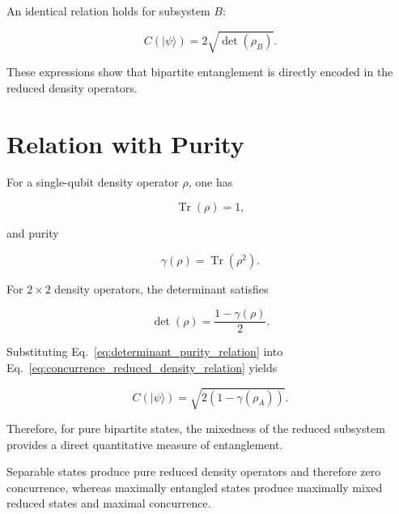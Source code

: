 \medskip

An identical relation holds for subsystem \( B \):

\begin{equation}
C(|\psi\rangle)
=
2\sqrt{\det(\rho_B)}.
\end{equation}

These expressions show that bipartite entanglement is directly encoded in the reduced density operators.


\section*{Relation with Purity}

For a single-qubit density operator \( \rho \), one has

\begin{equation}
\operatorname{Tr}(\rho)=1,
\label{eq:single_qubit_trace_condition}
\end{equation}

and purity

\begin{equation}
\gamma(\rho)
=
\operatorname{Tr}(\rho^2).
\label{eq:single_qubit_purity_definition}
\end{equation}

For \(2\times2\) density operators, the determinant satisfies

\begin{equation}
\det(\rho)
=
\frac{1-\gamma(\rho)}{2}.
\label{eq:determinant_purity_relation}
\end{equation}

Substituting Eq.~\eqref{eq:determinant_purity_relation} into Eq.~\eqref{eq:concurrence_reduced_density_relation} yields

\begin{equation}
C(|\psi\rangle)
=
\sqrt{
2\left(
1-\gamma(\rho_A)
\right)
}.
\label{eq:concurrence_purity_relation}
\end{equation}

Therefore, for pure bipartite states, the mixedness of the reduced subsystem provides a direct quantitative measure of entanglement.

\medskip

Separable states produce pure reduced density operators and therefore zero concurrence, whereas maximally entangled states produce maximally mixed reduced states and maximal concurrence.